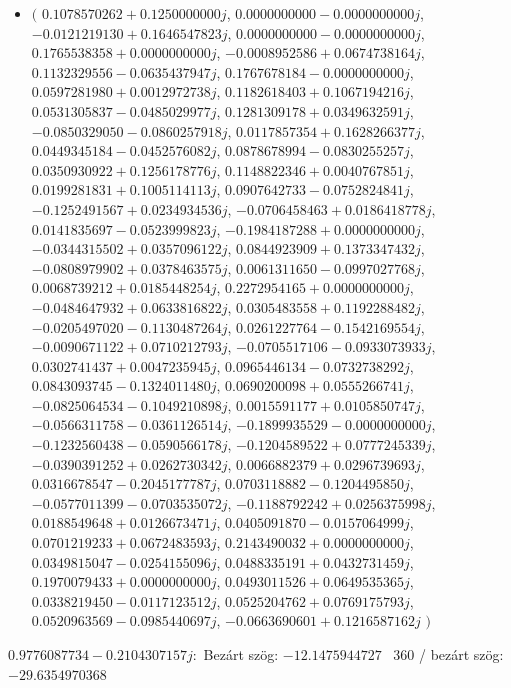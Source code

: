 \documentclass[14pt,a4paper]{article}
\begin{document}
\begin{itemize}
\item
$\big($
$0.1078570262+0.1250000000j$, $0.0000000000-0.0000000000j$, $-0.0121219130+0.1646547823j$, $0.0000000000-0.0000000000j$, $0.1765538358+0.0000000000j$, $-0.0008952586+0.0674738164j$, $0.1132329556-0.0635437947j$, $0.1767678184-0.0000000000j$, $0.0597281980+0.0012972738j$, $0.1182618403+0.1067194216j$, $0.0531305837-0.0485029977j$, $0.1281309178+0.0349632591j$, $-0.0850329050-0.0860257918j$, $0.0117857354+0.1628266377j$, $0.0449345184-0.0452576082j$, $0.0878678994-0.0830255257j$, $0.0350930922+0.1256178776j$, $0.1148822346+0.0040767851j$, $0.0199281831+0.1005114113j$, $0.0907642733-0.0752824841j$, $-0.1252491567+0.0234934536j$, $-0.0706458463+0.0186418778j$, $0.0141835697-0.0523999823j$, $-0.1984187288+0.0000000000j$, $-0.0344315502+0.0357096122j$, $0.0844923909+0.1373347432j$, $-0.0808979902+0.0378463575j$, $0.0061311650-0.0997027768j$, $0.0068739212+0.0185448254j$, $0.2272954165+0.0000000000j$, $-0.0484647932+0.0633816822j$, $0.0305483558+0.1192288482j$, $-0.0205497020-0.1130487264j$, $0.0261227764-0.1542169554j$, $-0.0090671122+0.0710212793j$, $-0.0705517106-0.0933073933j$, $0.0302741437+0.0047235945j$, $0.0965446134-0.0732738292j$, $0.0843093745-0.1324011480j$, $0.0690200098+0.0555266741j$, $-0.0825064534-0.1049210898j$, $0.0015591177+0.0105850747j$, $-0.0566311758-0.0361126514j$, $-0.1899935529-0.0000000000j$, $-0.1232560438-0.0590566178j$, $-0.1204589522+0.0777245339j$, $-0.0390391252+0.0262730342j$, $0.0066882379+0.0296739693j$, $0.0316678547-0.2045177787j$, $0.0703118882-0.1204495850j$, $-0.0577011399-0.0703535072j$, $-0.1188792242+0.0256375998j$, $0.0188549648+0.0126673471j$, $0.0405091870-0.0157064999j$, $0.0701219233+0.0672483593j$, $0.2143490032+0.0000000000j$, $0.0349815047-0.0254155096j$, $0.0488335191+0.0432731459j$, $0.1970079433+0.0000000000j$, $0.0493011526+0.0649535365j$, $0.0338219450-0.0117123512j$, $0.0525204762+0.0769175793j$, $0.0520963569-0.0985440697j$, $-0.0663690601+0.1216587162j$
$\big)$
\end{itemize}
$0.9776087734-0.2104307157j$:\
Bezárt szög: $-12.1475944727$ \
360 / bezárt szög: $-29.6354970368$\
\end{document}
